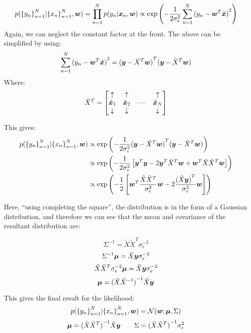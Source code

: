 \documentclass[../../main.tex]{subfiles}
\begin{document}
\[ p({\{y_n\}}_{n=1}^N | {\{x_n\}}_{n=1}^N, \bm{w}) =
\prod_{n=1}^N p(y_n | \bm{x}_n , \bm{w}) \propto
\exp{\left(
    -\frac{1}{2\sigma_e^2}
    \sum_{n=1}^N {(y_n -  \bm{w} ^T\tilde{ \bm{x} })}^2
\right)}
\]
Again, we can neglect the constant factor at the front. The above can be simplified by using:
\begin{align*}
\sum_{n=1}^N {(y_n - \bm{w}^T\tilde{\bm{x}})}^2 =
{(\bm{y} - \tilde{X}^T\bm{w})}^T {(\bm{y} - \tilde{X}^T\bm{w})}
\end{align*}
Where:
\[ \tilde{X}^T =
\left[ \begin{matrix}
    \uparrow & \uparrow & & \uparrow \\
    \tilde{\bm{x}}_1 & \tilde{\bm{x}}_2 & \cdots & \tilde{\bm{x}}_N \\
    \downarrow & \downarrow & & \downarrow
\end{matrix} \right]
\]

This gives:
\begin{align*}
p({\{y_n\}}_{n=1}^N | {\{x_n\}}_{n=1}^N, \bm{w})
&\propto \exp{\left(
    -\frac{1}{2\sigma_e^2}
    {( \bm{y}  - \tilde{X}^T \bm{w} )}^T {( \bm{y}  - \tilde{X}^T \bm{w} )}
\right)} \\
&\propto \exp{\left(
    -\frac{1}{2\sigma_e^2}
    \left[  \bm{y} ^T \bm{y}  - 2 \bm{y} ^T\tilde{X}^T \bm{w}  +  \bm{w} ^T\tilde{X}\tilde{X}^T \bm{w}  \right]
\right)} \\
&\propto \exp{\left(
    -\frac{1}{2}
    \left[  \bm{w} ^T\frac{\tilde{X} \tilde{X}^T}{\sigma_e^2} \bm{w}  - 2\frac{{(\tilde{X} \bm{y} )}^T}{\sigma_e^2}  \bm{w}  \right]
\right)}
\end{align*}

Here, ``using completing the square'', the distribution is in the form of a Gaussian distribution, and therefore we can see that the mean and covariance of the resultant distribution are:

\[\Sigma^{-1} = \tilde{X}\tilde{X}^T\sigma_e^{-2}\]
\[\Sigma^{-1}\bm{\mu} = \tilde{X}\bm{y}\sigma_e^{-2}\]
\[\tilde{X}\tilde{X}^T\sigma_e^{-2}\bm{\mu} = \tilde{X}\bm{y}\sigma_e^{-2}\]
\[\bm{\mu} = {(\tilde{X}\tilde{X}^{-1})}^{-1}\tilde{X}\bm{y}\]

This gives the final result for the likelihood:
\[
p({\{y_n\}}_{n=1}^N | {\{x_n\}}_{n=1}^N, \bm{w}) =
\mathcal{N}(\bm{w}; \bm{\mu}, \Sigma)
\]
\[
\bm{\mu} = {(\tilde{X}\tilde{X}^T)}^{-1} \tilde{X} \bm{y}
\quad\quad
\Sigma = {(\tilde{X}\tilde{X}^T)}^{-1}\sigma_e^2
\]
\end{document}
